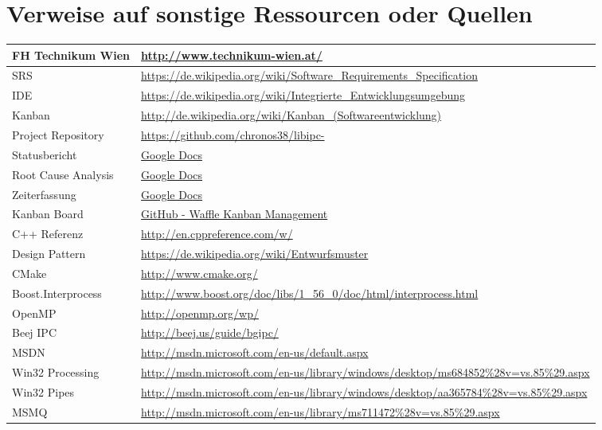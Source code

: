 \documentclass[a4paper]{book}
\begin{document}
\section{Verweise auf sonstige Ressourcen oder Quellen}
\begin{center}
\begin{longtable}{|p{3cm}|p{8cm}|}
\hline
FH Technikum Wien & \url{http://www.technikum-wien.at/} \\
\hline
SRS & \url{https://de.wikipedia.org/wiki/Software_Requirements_Specification} \\
\hline
IDE & \url{https://de.wikipedia.org/wiki/Integrierte_Entwicklungsumgebung} \\
\hline
Kanban & \url{http://de.wikipedia.org/wiki/Kanban_(Softwareentwicklung)} \\
\hline
Project Repository & \url{https://github.com/chronos38/libipc-} \\
\hline
Statusbericht & \href{https://docs.google.com/document/d/12IZJyU6WJ3upd81pHYRQ8KWd34AJqNXi5WnBbJPOtIQ/edit?usp=sharing}{Google Docs} \\
\hline
Root Cause Analysis & \href{https://docs.google.com/document/d/16PQXzEqp1hANgkXX1qEbKkaIwQ57bTGZWJuKGO_t0wA/edit?usp=sharing}{Google Docs} \\
\hline
Zeiterfassung & \href{https://docs.google.com/spreadsheet/ccc?key=0AuApAQ4FqnCEdHdiWThZX2V5b1BsM2lWYWdWSzZNRVE&usp=sharing}{Google Docs} \\
\hline
Kanban Board & \href{https://waffle.io/chronos38/libipc-}{GitHub - Waffle Kanban Management} \\
\hline
C++ Referenz & \url{http://en.cppreference.com/w/} \\
\hline
Design Pattern & \url{https://de.wikipedia.org/wiki/Entwurfsmuster} \\
\hline
CMake & \url{http://www.cmake.org/} \\
\hline
Boost.Interprocess & \url{http://www.boost.org/doc/libs/1_56_0/doc/html/interprocess.html} \\
\hline
OpenMP & \url{http://openmp.org/wp/} \\
\hline
Beej IPC & \url{http://beej.us/guide/bgipc/} \\
\hline
MSDN & \url{http://msdn.microsoft.com/en-us/default.aspx} \\
\hline
Win32 Processing & \url{http://msdn.microsoft.com/en-us/library/windows/desktop/ms684852\%28v=vs.85\%29.aspx} \\
\hline
Win32 Pipes & \url{http://msdn.microsoft.com/en-us/library/windows/desktop/aa365784\%28v=vs.85\%29.aspx} \\
\hline
MSMQ & \url{http://msdn.microsoft.com/en-us/library/ms711472\%28v=vs.85\%29.aspx} \\
\hline
\end{longtable}
\end{center}
\end{document}

